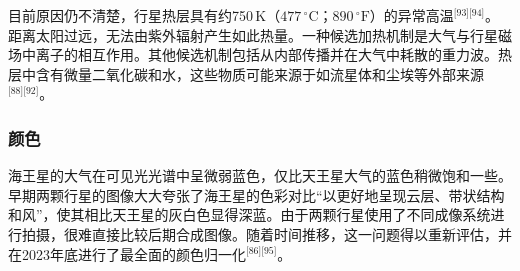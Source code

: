 目前原因仍不清楚，行星热层具有约750\,K（$477\,^\circ\text{C}$；$890\,^\circ\text{F}$）的异常高温\(^\text{[93][94]}\)。距离太阳过远，无法由紫外辐射产生如此热量。一种候选加热机制是大气与行星磁场中离子的相互作用。其他候选机制包括从内部传播并在大气中耗散的重力波。热层中含有微量二氧化碳和水，这些物质可能来源于如流星体和尘埃等外部来源\(^\text{[88][92]}\)。
\subsubsection{颜色}
海王星的大气在可见光光谱中呈微弱蓝色，仅比天王星大气的蓝色稍微饱和一些。早期两颗行星的图像大大夸张了海王星的色彩对比“以更好地呈现云层、带状结构和风”，使其相比天王星的灰白色显得深蓝。由于两颗行星使用了不同成像系统进行拍摄，很难直接比较后期合成图像。随着时间推移，这一问题得以重新评估，并在2023年底进行了最全面的颜色归一化\(^\text{[86][95]}\)。











